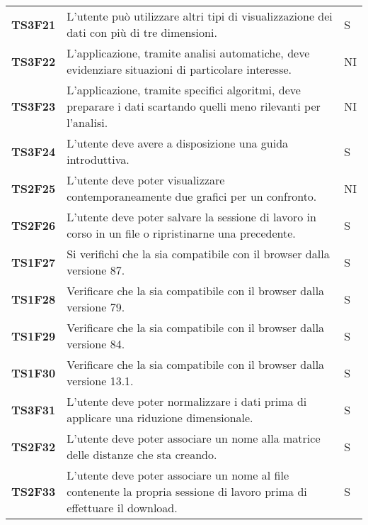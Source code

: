 {\begin{longtable}{ C{2cm} | C{12cm}| C{1.5cm} }
\textbf{TS3F21} & 
L'utente può utilizzare altri tipi di visualizzazione dei dati con più di tre dimensioni. & 
S\\

\textbf{TS3F22} & 
L'applicazione, tramite analisi automatiche, deve evidenziare situazioni di particolare interesse. & 
NI\\

\textbf{TS3F23} & 
L'applicazione, tramite specifici algoritmi, deve preparare i dati scartando quelli meno rilevanti per l'analisi. & 
NI\\

\textbf{TS3F24} & 
L'utente deve avere a disposizione una guida introduttiva. & 
S\\

\textbf{TS2F25} & 
L'utente deve poter visualizzare contemporaneamente due grafici per un confronto. & 
NI\\

\textbf{TS2F26} & 
L'utente deve poter salvare la sessione di lavoro in corso in un file  o ripristinarne una precedente. & 
S\\

\textbf{TS1F27} & 
Si verifichi che la  sia compatibile con il browser  dalla versione 87. & 
S\\

\textbf{TS1F28} & 
Verificare che la  sia compatibile con il browser  dalla versione 79. & 
S\\
		   
\textbf{TS1F29} & 
Verificare che la  sia compatibile con il browser  dalla versione 84. & 
S\\

\textbf{TS1F30} & 
Verificare che la  sia compatibile con il browser  dalla versione 13.1. & 
S\\

\textbf{TS3F31} & 
L'utente deve poter normalizzare i dati prima di applicare una riduzione dimensionale. & 
S\\

\textbf{TS2F32} & 
L'utente deve poter associare un nome alla matrice delle distanze che sta creando. & 
S\\

\textbf{TS2F33} & 
L'utente deve poter associare un nome al file contenente la propria sessione di lavoro prima di effettuare il download. & 
S\\



\end{longtable}}
